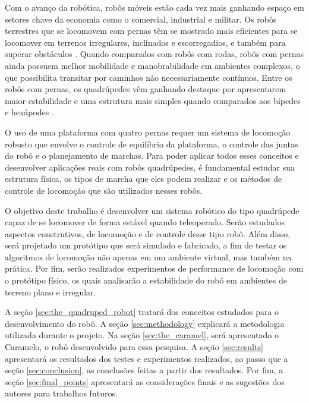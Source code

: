 \documentclass[../main.tex]{subfiles}
\begin{document}
Com o avanço da robótica, robôs móveis estão cada vez mais ganhando espaço em setores chave da economia como o comercial, industrial e militar. Os robôs terrestres que se locomovem com pernas têm se mostrado mais eficientes para se locomover em terrenos irregulares, inclinados e escorregadios, e também para superar obstáculos \cite{X.134}. Quando comparados com robôs com rodas, robôs com pernas ainda possuem melhor mobilidade e manobrabilidade em ambientes complexos, o que possibilita transitar por caminhos não necessariamente contínuos. Entre os robôs com pernas, os quadrúpedes vêm ganhando destaque por apresentarem maior estabilidade e uma estrutura mais simples quando comparados aos bípedes e hexápodes \cite{Shi2021}.


O uso de uma plataforma com quatro pernas requer um sistema de locomoção robusto que envolve o controle de equilíbrio da plataforma, o controle das juntas do robô e o planejamento de marchas. Para poder aplicar todos esses conceitos e desenvolver aplicações reais com robôs quadrúpedes, é fundamental estudar sua estrutura física, os tipos de marcha que eles podem realizar e os métodos de controle de locomoção que são utilizados nesses robôs.

O objetivo deste trabalho é desenvolver um sistema robótico do tipo quadrúpede capaz de se locomover de forma estável quando teleoperado. Serão estudados aspectos construtivos, de locomoção e de controle desse tipo robô. Além disso, será projetado um protótipo que será simulado e fabricado, a fim de testar os algoritmos de locomoção não apenas em um ambiente virtual, mas também na prática. Por fim, serão realizados experimentos de performance de locomoção com o protótipo físico, os quais analisarão a estabilidade do robô em ambientes de terreno plano e irregular.

A seção \ref{sec:the_quadruped_robot} tratará dos conceitos estudados para o desenvolvimento do robô. A seção \ref{sec:methodology} explicará a metodologia utilizada durante o projeto. Na seção \ref{sec:the_caramel}, será apresentado o Caramelo, o robô desenvolvido para essa pesquisa. A seção \ref{sec:results} apresentará os resultados dos testes e experimentos realizados, ao passo que a seção \ref{sec:conclusion}, as conclusões feitas a partir dos resultados. Por fim, a seção \ref{sec:final_points} apresentará as considerações finais e as sugestões dos autores para trabalhos futuros.
\end{document}
